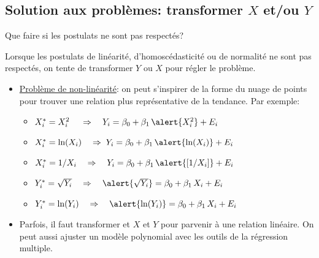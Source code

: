 \documentclass{BeamerTemplate}
\begin{document}
\subsection{Solution aux problèmes: transformer $X$ et/ou $Y$}\label{sec:transfo}

\begin{frame}[t]{Que faire si les postulats ne sont pas respectés?}

{\small
Lorsque les postulats de linéarité, d'homoscédasticité ou de normalité ne sont pas respectés, on tente de  \alert{ transformer $Y$ ou $X$} pour régler le problème.
\begin{itemize}
\item<2-> \underline{Problème de non-linéarité}: on peut s'inspirer de la forme du nuage de points pour trouver une relation plus représentative de la tendance. Par exemple:
    \begin{itemize}\itemsep2mm
    \item<2-> $X_i^*=X_i^2\quad\;\Rightarrow\quad Y_i=\beta_0+\beta_1\,\alert{X_i^2}+E_i$
    \item<2-> $X_i^*=\text{ln}(X_i)\quad\Rightarrow\; Y_i=\beta_0+\beta_1\,\alert{\text{ln}(X_i)}+E_i$
    \item<2-> $X_i^*=1/X_i\quad\Rightarrow\quad Y_i=\beta_0+\beta_1\,\alert{[1/X_i]}+E_i$
    \item<3-> $Y_i^*=\sqrt{Y_i}\quad\Rightarrow\quad \alert{\sqrt{Y_i}}=\beta_0+\beta_1\,X_i+E_i$
    \item<3-> $Y_i^*=\text{ln}(Y_i)\quad\Rightarrow\quad \alert{\text{ln}(Y_i)}=\beta_0+\beta_1\,X_i+E_i$
    \end{itemize}
\item<4-> Parfois, il faut transformer et \alert{$X$ et $Y$} pour parvenir à une relation linéaire. On peut aussi ajuster un modèle polynomial avec les outils de la régression multiple.
\end{itemize}
}
\end{frame}
\end{document}
